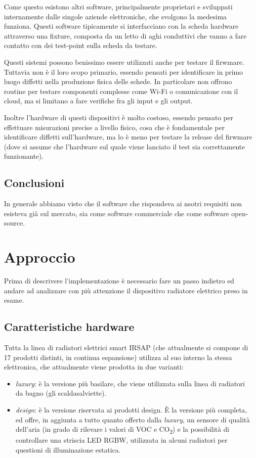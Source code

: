 \documentclass[12pt,a4paper,twoside,titlepage]{book}
\begin{document}
Come questo esistono altri software, principalmente proprietari e sviluppati internamente dalle singole
aziende elettroniche, che svolgono la medesima funziona. Questi software tipicamente si interfacciano
con la scheda hardware attraverso una fixture, composta da un letto di aghi conduttivi che vanno a
fare contatto con dei test-point sulla scheda da testare.

Questi sistemi possono benissimo essere utilizzati anche per testare il firwmare. Tuttavia non è
il loro scopo primario, essendo pensati per identificare in primo luogo diffetti nella produzione
fisica delle schede. In particolare non offrono routine per testare componenti complesse come Wi-Fi o comunicazione con il
cloud, ma si limitano a fare verifiche fra gli input e gli output.

Inoltre l'hardware di questi dispositivi è molto costoso, essendo pensato per effettuare misurazioni
precise a livello fisico, cosa che è fondamentale per identificare diffetti sull'hardware, ma lo è
meno per testare la release del firwmare (dove si assume che l'hardware sul quale viene lanciato il test
sia correttamente funzionante).

\section{Conclusioni}

In generale abbiamo visto che il software che rispondeva ai nsotri requisiti non esisteva già sul mercato,
sia come software commerciale che come software open-source.

\chapter{Approccio}

Prima di descrivere l'implementazione è necessario fare un passo indietro ed andare
ad analizzare con più attenzione il dispositivo radiatore elettrico preso in esame.

\section{Caratteristiche hardware}

Tutta la linea di radiatori elettrici smart IRSAP (che attualmente si compone di 17 prodotti distinti,
in continua espansione) utilizza al suo interno la stessa elettronica, che attualmente viene
prodotta in due varianti:

\begin{itemize}
    \item \textit{luxury}: è la versione più basilare, che viene utilizzata sulla linea di
        radiatori da bagno (gli scaldasalviette).
    \item \textit{design}: è la versione riservata ai prodotti design. È la versione più completa,
        ed offre, in aggiunta a tutto quanto offerto dalla \textit{luxury}, un sensore di qualità
        dell'aria (in grado di rilevare i valori di VOC e CO\textsubscript{2}) e la possibilità di
        controllare una striscia LED RGBW, utilizzata in alcuni radiatori per questioni
        di illuminazione estatica.
\end{itemize}
\end{document}
